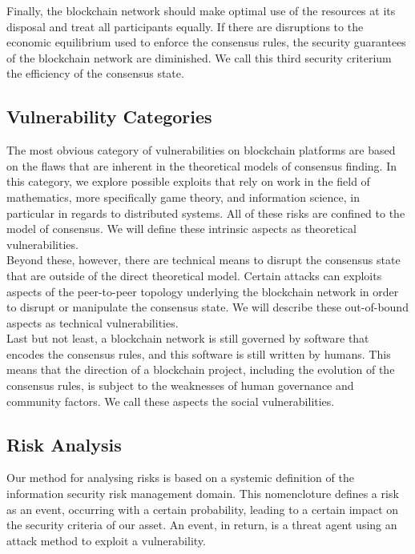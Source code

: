 \documentclass[11pt,a4paper]{article}
\begin{document}
Finally, the blockchain network should make optimal use of the resources at its disposal and treat all participants equally. If there are disruptions to the economic equilibrium used to enforce the consensus rules, the security guarantees of the blockchain network are diminished. We call this third security criterium the efficiency of the consensus state.\\

\subsection{Vulnerability Categories}

The most obvious category of vulnerabilities on blockchain platforms are based on the flaws that are inherent in the theoretical models of consensus finding. In this category, we explore possible exploits that rely on work in the field of mathematics, more specifically game theory, and information science, in particular in regards to distributed systems. All of these risks are confined to the model of consensus. We will define these intrinsic aspects as theoretical vulnerabilities.\\

Beyond these, however, there are technical means to disrupt the consensus state that are outside of the direct theoretical model. Certain attacks can exploits aspects of the peer-to-peer topology underlying the blockchain network in order to disrupt or manipulate the consensus state. We will describe these out-of-bound aspects as technical vulnerabilities.\\

Last but not least, a blockchain network is still governed by software that encodes the consensus rules, and this software is still written by humans. This means that the direction of a blockchain project, including the evolution of the consensus rules, is subject to the weaknesses of human governance and community factors. We call these aspects the social vulnerabilities.\\

\subsection{Risk Analysis}

Our method for analysing risks is based on a systemic definition of the information security risk management domain. This nomencloture defines a risk as an event, occurring with a certain probability, leading to a certain impact on the security criteria of our asset. An event, in return, is a threat agent using an attack method to exploit a vulnerability.\\
\end{document}
